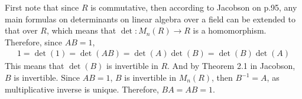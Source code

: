 \documentclass[12pt]{article}
\begin{document}
\begin{fproof}[Jacobson 2.3.2]
    First note that since \(R\) is commutative, then according to Jacobson on p.95, any main formulas on determinants on linear algebra over a field can be extended to that over \(R\), which means that \(\det: M_n(R) \to R\) is a homomorphism.
    Therefore, since \(AB = 1\), 
    \begin{align*}
        1 = \det(1)= \det(AB) = \det(A) \det(B) = \det(B)\det(A)
    \end{align*}
    This means that \(\det(B)\) is invertible in \(R\).
    And by Theorem 2.1 in Jacobson,
    \(B\) is invertible.
    Since \(AB = 1\), \(B\) is invertible in \(M_n(R)\), then \(B^{-1} = A\), as multiplicative inverse is unique.
    Therefore, \(BA = AB = 1\).
\end{fproof}
\newpage
\end{document}
